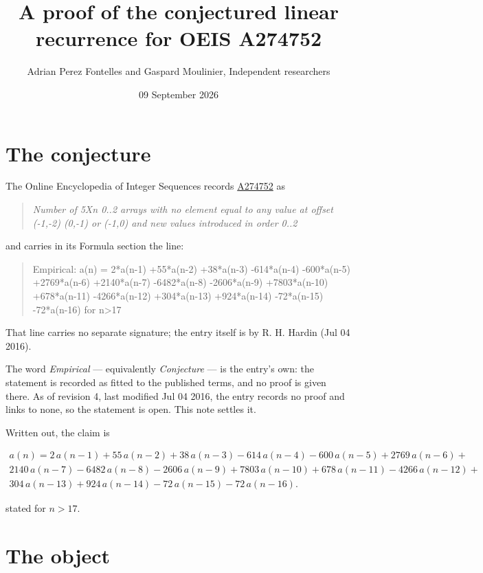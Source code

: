 \documentclass[11pt]{article}
\title{A proof of the conjectured linear recurrence for OEIS A274752}
\author{Adrian Perez Fontelles and Gaspard Moulinier, Independent researchers}
\date{09 September 2026}
\theoremstyle{definition}
\begin{document}
\maketitle
\section{The conjecture}

The Online Encyclopedia of Integer Sequences records \href{https://oeis.org/A274752}{A274752} as

\begin{quote}\itshape Number of 5Xn 0..2 arrays with no element equal to any value at offset (-1,-2) (0,-1) or (-1,0) and new values introduced in order 0..2\end{quote}

and carries in its Formula section the line:

\begin{quote}\ttfamily Empirical: a(n) = 2*a(n-1) +55*a(n-2) +38*a(n-3) -614*a(n-4) -600*a(n-5) +2769*a(n-6) +2140*a(n-7) -6482*a(n-8) -2606*a(n-9) +7803*a(n-10) +678*a(n-11) -4266*a(n-12) +304*a(n-13) +924*a(n-14) -72*a(n-15) -72*a(n-16) for n>17\end{quote}

That line carries no separate signature; the entry itself is by R. H. Hardin (Jul 04 2016).

The word {\itshape Empirical} --- equivalently {\itshape Conjecture} --- is the entry's own: the statement is recorded as fitted to the published terms, and no proof is given there. As of revision 4, last modified Jul 04 2016, the entry records no proof and links to none, so the statement is open. This note settles it.

Written out, the claim is

\begin{multline*} a(n) = 2\,a(n-1) + 55\,a(n-2) + 38\,a(n-3) - 614\,a(n-4) - 600\,a(n-5) + 2769\,a(n-6) + \\ 2140\,a(n-7) - 6482\,a(n-8) - 2606\,a(n-9) + 7803\,a(n-10) + 678\,a(n-11) - 4266\,a(n-12) + \\ 304\,a(n-13) + 924\,a(n-14) - 72\,a(n-15) - 72\,a(n-16). \end{multline*}

stated for $n > 17$.

\section{The object}
\end{document}
